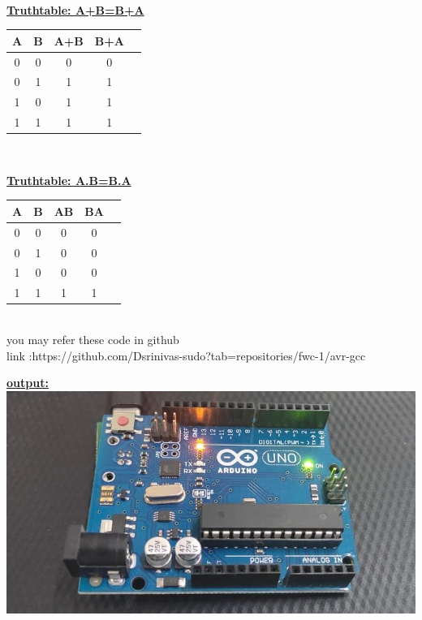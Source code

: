 \documentclass[letterpaper, 10 pt, conference]{ieeeconf}
\begin{document}
\begin{left}
\vspace{5cm}
\\ \raggedright \textbf{\underline{Truthtable: A+B=B+A}}\vspace{2mm}
\begin{table}[ht]
\centering %
\begin{tabular}{c c c c c} %
\hline\hline %
 \textbf{A} & \textbf{B} & \textbf{A+B} &\textbf{B+A}\\ [0.5ex] %
\hline
      0 & 0 & 0 & 0\\
      0 & 1 & 1 & 1\\
      1 & 0 & 1 & 1\\
      1 & 1 & 1 & 1\\
\hline
\end{tabular}
\end{table}
\vspace{2cm}
\\ \raggedright \textbf{\underline{Truthtable: A.B=B.A}}\vspace{2mm}
\begin{table}[ht]
\centering %
\begin{tabular}{c c c c c} %
\hline\hline %
  \textbf{A} & \textbf{B} & \textbf{AB} &\textbf{BA}\\ [0.5ex] %
\hline
      0 & 0 & 0 & 0\\
      0 & 1 & 0 & 0\\
      1 & 0 & 0 & 0\\
      1 & 1 & 1 & 1\\
\hline
\end{tabular}
\end{table}
\raggedright \textbf{\underline{}}\vspace{7mm}
\\you may  refer these code in github
\\ link    :https://github.com/Dsrinivas-sudo?tab=repositories/fwc-1/avr-gcc
\vspace{2cm}



\raggedright \textbf{\underline{output:}}\vspace{2mm}
\includegraphics{ress.jpeg}
\vspace{5cm}
\begin{figure}


\end{figure}
\end{left}
\end{document}
